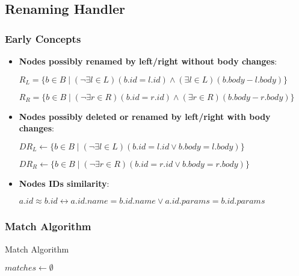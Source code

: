 \documentclass[../../Algorithms.tex]{subfiles}
\begin{document}
    \subsection{Renaming Handler}

    \subsubsection{Early Concepts}

    \begin{itemize}
        \item \textbf{Nodes possibly renamed by left/right without body changes}:
        
        $R_L = \{b \in B \mid (\lnot \exists l \in L)(b.id = l.id) \land (\exists l \in L)(b.body - l.body)\}$

        $R_R = \{b \in B \mid (\lnot \exists r \in R)(b.id = r.id) \land (\exists r \in R)(b.body - r.body)\}$

        \item \textbf{Nodes possibly deleted or renamed by left/right with body changes}:
        
        $DR_L \leftarrow \{b \in B \mid (\lnot \exists l \in L)(b.id = l.id \lor b.body = l.body)\}$

        $DR_R \leftarrow \{b \in B \mid (\lnot \exists r \in R)(b.id = r.id \lor b.body = r.body)\}$

        \item \textbf{Nodes IDs similarity}:
        
        $a.id \approx b.id \leftrightarrow a.id.name = b.id.name \lor a.id.params = b.id.params$
    \end{itemize}

    \subsubsection{Match Algorithm}
    
    \begin{algorithm}[H]
        \caption{Match Algorithm}
        \SetAlgoLined

        
        \BlankLine
        
        $matches \leftarrow \emptyset$\;

        \BlankLine
    \end{algorithm}
\end{document}
